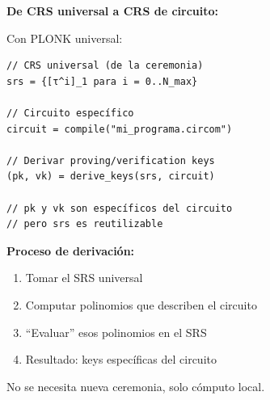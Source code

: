 \documentclass[11pt,a4paper,twoside,openright]{book}
\theoremstyle{definition}
\theoremstyle{plain}
\theoremstyle{remark}
\begin{document}
\begin{keyidea}
\textbf{De CRS universal a CRS de circuito:}

Con PLONK universal:
\begin{verbatim}
// CRS universal (de la ceremonia)
srs = {[τ^i]_1 para i = 0..N_max}

// Circuito específico
circuit = compile("mi_programa.circom")

// Derivar proving/verification keys
(pk, vk) = derive_keys(srs, circuit)

// pk y vk son específicos del circuito
// pero srs es reutilizable
\end{verbatim}

\textbf{Proceso de derivación:}
\begin{enumerate}
    \item Tomar el SRS universal
    \item Computar polinomios que describen el circuito
    \item ``Evaluar'' esos polinomios en el SRS
    \item Resultado: keys específicas del circuito
\end{enumerate}

No se necesita nueva ceremonia, solo cómputo local.
\end{keyidea}
\end{document}
